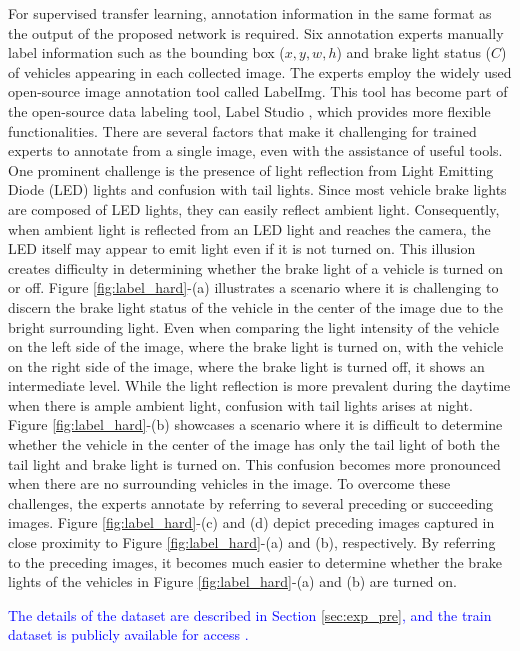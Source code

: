 For supervised transfer learning, annotation information in the same format as the output of the proposed network is required.
Six annotation experts manually label information such as the bounding box ($x, y, w, h$) and brake light status ($C$) of vehicles appearing in each collected image.
The experts employ the widely used open-source image annotation tool called LabelImg.
This tool has become part of the open-source data labeling tool, Label Studio \cite{Label_Studio}, which provides more flexible functionalities.
There are several factors that make it challenging for trained experts to annotate from a single image, even with the assistance of useful tools.
One prominent challenge is the presence of light reflection from Light Emitting Diode (LED) lights and confusion with tail lights.
Since most vehicle brake lights are composed of LED lights, they can easily reflect ambient light.
Consequently, when ambient light is reflected from an LED light and reaches the camera, the LED itself may appear to emit light even if it is not turned on.
This illusion creates difficulty in determining whether the brake light of a vehicle is turned on or off.
Figure \ref{fig:label_hard}-(a) illustrates a scenario where it is challenging to discern the brake light status of the vehicle in the center of the image due to the bright surrounding light. 
Even when comparing the light intensity of the vehicle on the left side of the image, where the brake light is turned on, with the vehicle on the right side of the image, where the brake light is turned off, it shows an intermediate level.
While the light reflection is more prevalent during the daytime when there is ample ambient light, confusion with tail lights arises at night.
Figure \ref{fig:label_hard}-(b) showcases a scenario where it is difficult to determine whether the vehicle in the center of the image has only the tail light of both the tail light and brake light is turned on.
This confusion becomes more pronounced when there are no surrounding vehicles in the image.
To overcome these challenges, the experts annotate by referring to several preceding or succeeding images. 
Figure \ref{fig:label_hard}-(c) and (d) depict preceding images captured in close proximity to Figure \ref{fig:label_hard}-(a) and (b), respectively.
By referring to the preceding images, it becomes much easier to determine whether the brake lights of the vehicles in Figure \ref{fig:label_hard}-(a) and (b) are turned on.

\textcolor{blue}{The details of the dataset are described in Section \ref{sec:exp_pre}, and the train dataset is publicly available for access \cite{brake-light-detection_dataset}.}




